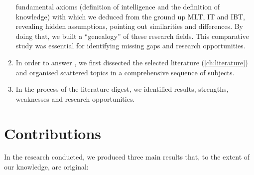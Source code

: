\documentclass[
  letterpaper,
  a4paper,
  12pt,
  twoside,
  brazil,
  british,
  open=right]{scrbook}
\begin{document}
\begin{enumerate}
  fundamental axioms (definition of intelligence and the definition of
  knowledge) with which we deduced from the ground up {MLT}, {IT} and
  {IBT}, revealing hidden assumptions, pointing out similarities and
  differences. By doing that, we built a ``genealogy'' of these research
  fields. This comparative study was essential for identifying missing
  gaps and research opportunities.
\item
  In order to answer , we first dissected the selected literature
  (\protect\hyperlink{ch:literature}{{[}ch:literature{]}}) and organised
  scattered topics in a comprehensive sequence of subjects.
\item
  In the process of the literature digest, we identified results,
  strengths, weaknesses and research opportunities.
\end{enumerate}

\hypertarget{contributions}{%
\section{Contributions}\label{contributions}}

In the research conducted, we produced three main results that, to the
extent of our knowledge, are original:
\end{document}
